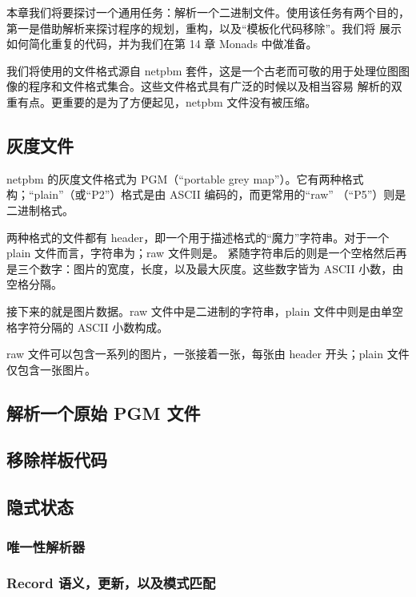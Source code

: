 \documentclass[./main.tex]{subfiles}
\begin{document}
本章我们将要探讨一个通用任务：解析一个二进制文件。使用该任务有两个目的，第一是借助解析来探讨程序的规划，重构，以及“模板化代码移除”。我们将
展示如何简化重复的代码，并为我们在第 14 章 Monads 中做准备。

我们将使用的文件格式源自 netpbm 套件，这是一个古老而可敬的用于处理位图图像的程序和文件格式集合。这些文件格式具有广泛的时候以及相当容易
解析的双重有点。更重要的是为了方便起见，netpbm 文件没有被压缩。

\subsection*{灰度文件}

netpbm 的灰度文件格式为 PGM（“portable grey map”）。它有两种格式构；“plain”（或“P2”）格式是由 ASCII 编码的，而更常用的“raw”
（“P5”）则是二进制格式。

两种格式的文件都有 header，即一个用于描述格式的“魔力”字符串。对于一个 plain 文件而言，字符串为；raw 文件则是。
紧随字符串后的则是一个空格然后再是三个数字：图片的宽度，长度，以及最大灰度。这些数字皆为 ASCII 小数，由空格分隔。

接下来的就是图片数据。raw 文件中是二进制的字符串，plain 文件中则是由单空格字符分隔的 ASCII 小数构成。

raw 文件可以包含一系列的图片，一张接着一张，每张由 header 开头；plain 文件仅包含一张图片。

\subsection*{解析一个原始 PGM 文件}

\subsection*{移除样板代码}

\subsection*{隐式状态}

\subsubsection*{唯一性解析器}

\subsubsection*{Record 语义，更新，以及模式匹配}
\end{document}
